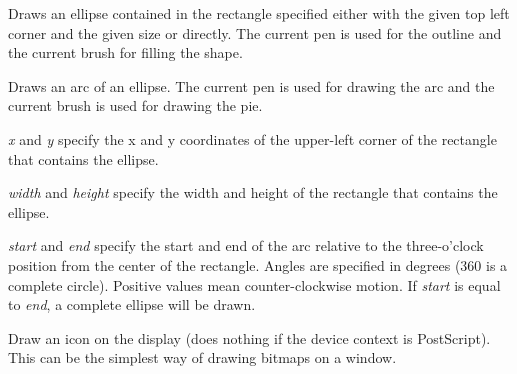 \label{wxdcdrawellipse}




Draws an ellipse contained in the rectangle specified either with the given top
left corner and the given size or directly. The current pen is used for the
outline and the current brush for filling the shape.



\label{wxdcdrawellipticarc}


Draws an arc of an ellipse. The current pen is used for drawing the arc and
the current brush is used for drawing the pie.

{\it x} and {\it y} specify the x and y coordinates of the upper-left corner of the rectangle that contains
the ellipse.

{\it width} and {\it height} specify the width and height of the rectangle that contains
the ellipse.

{\it start} and {\it end} specify the start and end of the arc relative to the three-o'clock
position from the center of the rectangle. Angles are specified
in degrees (360 is a complete circle). Positive values mean
counter-clockwise motion. If {\it start} is equal to {\it end}, a
complete ellipse will be drawn.

\label{wxdcdrawicon}


Draw an icon on the display (does nothing if the device context is PostScript).
This can be the simplest way of drawing bitmaps on a window.

\label{wxdcdrawline}


